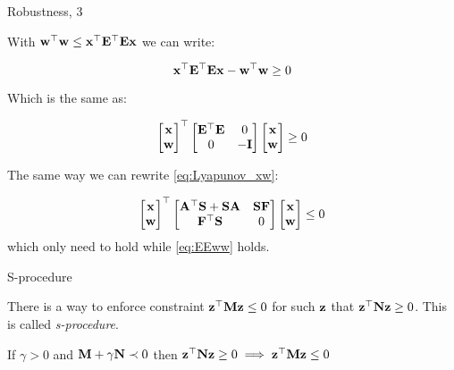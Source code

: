 \documentclass{beamer}
\begin{document}
\begin{frame}{Robustness, 3}
	\begin{flushleft}
		
		With $\mathbf{w}^\top \mathbf{w} 
		\leq
		\mathbf{x}^\top\mathbf{E}^\top \mathbf{E}\mathbf{x}$ we can write:
		
		\begin{equation}
		\mathbf{x}^\top\mathbf{E}^\top \mathbf{E}\mathbf{x} - \mathbf{w}^\top \mathbf{w} \geq 0
		\end{equation}	

Which is the same as:
	
		\begin{equation}
			\label{eq:EEww}
			\begin{bmatrix}
				\mathbf{x} \\ \mathbf{w}
			\end{bmatrix}^\top
		\begin{bmatrix}
			\mathbf{E}^\top \mathbf{E} & 0 \\
			0 & -\mathbf{I}
		\end{bmatrix}		
		\begin{bmatrix}
			\mathbf{x} \\ \mathbf{w}
		\end{bmatrix}
		\geq 0
		\end{equation}	
		
The same way we can rewrite \eqref{eq:Lyapunov_xw}:

		\begin{equation}
			\label{eq:xw_Lyapunov}
	\begin{bmatrix}
		\mathbf{x} \\ \mathbf{w}
	\end{bmatrix}^\top
	\begin{bmatrix}
		\mathbf{A}^\top \mathbf{S} + \mathbf{S}\mathbf{A} & \mathbf{S}\mathbf{F} \\
		\mathbf{F}^\top\mathbf{S} & 0
	\end{bmatrix}		
	\begin{bmatrix}
		\mathbf{x} \\ \mathbf{w}
	\end{bmatrix}
	\leq 0
\end{equation}	
	which only need to hold while \eqref{eq:EEww} holds.
		
	\end{flushleft}
\end{frame}



\begin{frame}{S-procedure}
	\begin{flushleft}
		
		There is a way to enforce constraint $\mathbf{z}^\top \mathbf{M}\mathbf{z} \leq 0$ for such $\mathbf{z}$ that $\mathbf{z}^\top \mathbf{N}\mathbf{z} \geq 0$. This is called \emph{s-procedure}.
		
		\begin{theorem}
			If $\gamma > 0$ and $\mathbf{M} + \gamma \mathbf{N} \prec 0$ then $\mathbf{z}^\top \mathbf{N}\mathbf{z} \geq 0 \implies \mathbf{z}^\top \mathbf{M}\mathbf{z} \leq 0$ 
		\end{theorem}
		
	\end{flushleft}
\end{frame}
\end{document}
